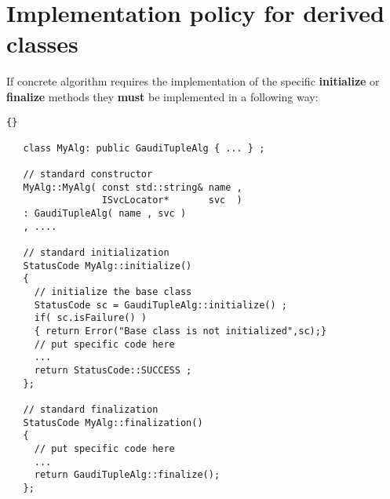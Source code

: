 \documentclass{lhcbnote}
\newcommand{\bftt}         {\ttfamily\bfseries}
\begin{document}
\section{Implementation policy for derived classes}
If concrete algorithm requires the implementation of 
the specific {\bftt{initialize}} or 
{\bftt{finalize}} methods they {\bftt{must}} be implemented 
in a following way:

\begin{scriptsize}
 \begin{lstlisting}{}

   class MyAlg: public GaudiTupleAlg { ... } ;

   // standard constructor 
   MyAlg::MyAlg( const std::string& name , 
                 ISvcLocator*       svc  ) 
   : GaudiTupleAlg( name , svc ) 
   , ....

   // standard initialization
   StatusCode MyAlg::initialize() 
   {
     // initialize the base class 
     StatusCode sc = GaudiTupleAlg::initialize() ;
     if( sc.isFailure() ) 
     { return Error("Base class is not initialized",sc);}
     // put specific code here 
     ...
     return StatusCode::SUCCESS ;
   };
   
   // standard finalization
   StatusCode MyAlg::finalization() 
   {
     // put specific code here 
     ...
     return GaudiTupleAlg::finalize();
   };

 \end{lstlisting}
\end{scriptsize}
\end{document}
